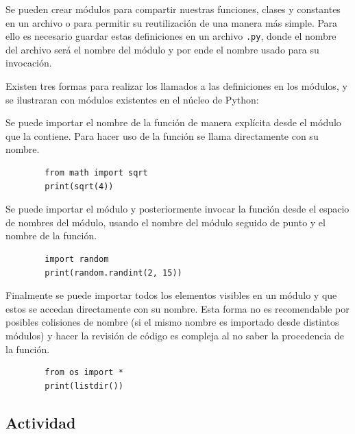 Se pueden crear módulos para compartir nuestras funciones, clases y
constantes en un archivo o para permitir su reutilización de una manera
más simple. Para ello es necesario guardar estas definiciones en un
archivo \texttt{.py}, donde el nombre del archivo será el nombre del
módulo y por ende el nombre usado para su invocación.

Existen tres formas para realizar los llamados a las definiciones en los
módulos, y se ilustraran con módulos existentes en el núcleo de Python:

Se puede importar el nombre de la función de manera explícita desde el
módulo que la contiene. Para hacer uso de la función se llama
directamente con su nombre.

\begin{listing}[H]
    \begin{verbatim}
        from math import sqrt
        print(sqrt(4))
    \end{verbatim}
\end{listing}

Se puede importar el módulo y posteriormente invocar la función desde el
espacio de nombres del módulo, usando el nombre del módulo seguido de
punto y el nombre de la función.

\begin{listing}[H]
    \begin{verbatim}
        import random
        print(random.randint(2, 15))
    \end{verbatim}
\end{listing}

Finalmente se puede importar todos los elementos visibles en un módulo y
que estos se accedan directamente con su nombre. Esta forma no es
recomendable por posibles colisiones de nombre (si el mismo nombre es
importado desde distintos módulos) y hacer la revisión de código es
compleja al no saber la procedencia de la función.

\begin{listing}[H]
    \begin{verbatim}
        from os import * 
        print(listdir())
    \end{verbatim}
\end{listing}



\subsection{Actividad}

